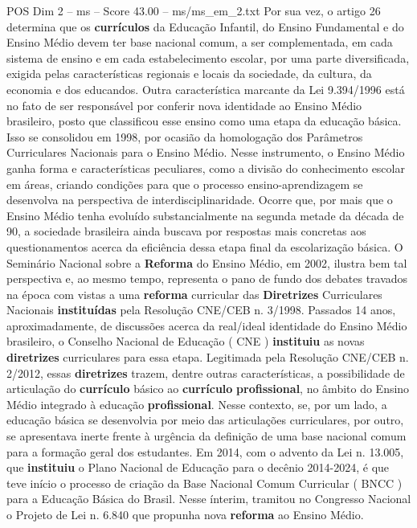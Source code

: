 \begin{textsample}{POS Dim 2 – ms – Score 43.00 – ms/ms\_em\_2.txt}
Por sua vez, o artigo 26 determina que os \textbf{currículos} da Educação Infantil, do Ensino Fundamental e do Ensino Médio devem ter base nacional comum, a ser complementada, em cada sistema de ensino e em cada estabelecimento escolar, por uma parte diversificada, exigida pelas características regionais e locais da sociedade, da cultura, da economia e dos educandos.
Outra característica marcante da Lei 9.394/1996 está no fato de ser responsável por conferir nova identidade ao Ensino Médio brasileiro, posto que classificou esse ensino como uma etapa da educação básica.
Isso se consolidou em 1998, por ocasião da homologação dos Parâmetros Curriculares Nacionais para o Ensino Médio.
Nesse instrumento, o Ensino Médio ganha forma e características peculiares, como a divisão do conhecimento escolar em áreas, criando condições para que o processo ensino-aprendizagem se desenvolva na perspectiva de interdisciplinaridade.
Ocorre que, por mais que o Ensino Médio tenha evoluído substancialmente na segunda metade da década de 90, a sociedade brasileira ainda buscava por respostas mais concretas aos questionamentos acerca da eficiência dessa etapa final da escolarização básica.
O Seminário Nacional sobre a \textbf{Reforma} do Ensino Médio, em 2002, ilustra bem tal perspectiva e, ao mesmo tempo, representa o pano de fundo dos debates travados na época com vistas a uma \textbf{reforma} curricular das \textbf{Diretrizes} Curriculares Nacionais \textbf{instituídas} pela Resolução CNE/CEB n. 3/1998.
Passados 14 anos, aproximadamente, de discussões acerca da real/ideal identidade do Ensino Médio brasileiro, o Conselho Nacional de Educação ( CNE ) \textbf{instituiu} as novas \textbf{diretrizes} curriculares para essa etapa.
Legitimada pela Resolução CNE/CEB n. 2/2012, essas \textbf{diretrizes} trazem, dentre outras características, a possibilidade de articulação do \textbf{currículo} básico ao \textbf{currículo} \textbf{profissional}, no âmbito do Ensino Médio integrado à educação \textbf{profissional}.
Nesse contexto, se, por um lado, a educação básica se desenvolvia por meio das articulações curriculares, por outro, se apresentava inerte frente à urgência da definição de uma base nacional comum para a formação geral dos estudantes.
Em 2014, com o advento da Lei n. 13.005, que \textbf{instituiu} o Plano Nacional de Educação para o decênio 2014-2024, é que teve início o processo de criação da Base Nacional Comum Curricular ( BNCC ) para a Educação Básica do Brasil.
Nesse ínterim, tramitou no Congresso Nacional o Projeto de Lei n. 6.840 que propunha nova \textbf{reforma} ao Ensino Médio.

\end{textsample}
